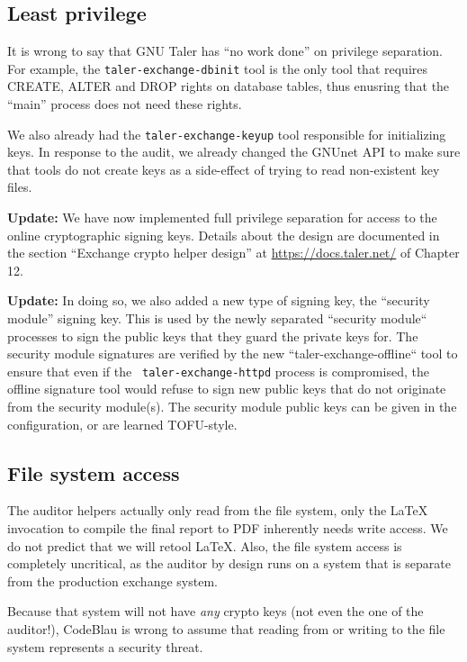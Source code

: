 \documentclass[11pt]{article}
\begin{document}
\subsection{Least privilege}

It is wrong to say that GNU Taler has ``no work done'' on privilege separation.
For example, the {\tt taler-exchange-dbinit} tool is the only tool that requires
CREATE, ALTER and DROP rights on database tables, thus enusring that the ``main''
process does not need these rights.

We also already had the {\tt taler-exchange-keyup} tool responsible for
initializing keys. In response to the audit, we already changed the GNUnet API
to make sure that tools do not create keys as a side-effect of trying to read
non-existent key files.

{\bf Update:} We have now implemented full privilege separation for access to the online
cryptographic signing keys.  Details about the design are documented in the
section ``Exchange crypto helper design'' at \url{https://docs.taler.net/} of
Chapter 12.

{\bf Update:} In doing so, we also added a new type of signing key, the
``security module'' signing key. This is used by the newly separated ``security
module`` processes to sign the public keys that they guard the private keys
for. The security module signatures are verified by the new
``taler-exchange-offline`` tool to ensure that even if the {\tt
taler-exchange-httpd} process is compromised, the offline signature tool would
refuse to sign new public keys that do not originate from the security
module(s).  The security module public keys can be given in the configuration,
or are learned TOFU-style.


\subsection{File system access}

The auditor helpers actually only read from the file system, only the LaTeX
invocation to compile the final report to PDF inherently needs write
access. We do not predict that we will retool LaTeX.  Also, the file system
access is completely uncritical, as the auditor by design runs on a system
that is separate from the production exchange system.

Because that system will not have {\em any} crypto keys (not even the one of
the auditor!), CodeBlau is wrong to assume that reading from or writing to the
file system represents a security threat.
\end{document}

